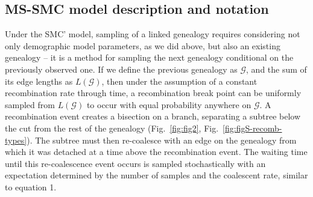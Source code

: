 \documentclass[11pt]{article}
\begin{document}

\subsection{MS-SMC model description and notation}

Under the SMC' model, sampling of a linked genealogy requires considering not only 
demographic model parameters, 
as we did above, but also an existing genealogy -- it is a method 
for sampling the next genealogy conditional on the previously observed one. 
If we define the previous genealogy as $\mathcal{G}$, and the sum of its edge lengths 
as $L(\mathcal{G})$, then under the assumption of a constant recombination rate through time,
a recombination break point can be uniformly sampled from $L(\mathcal{G})$ to occur with 
equal probability anywhere on $\mathcal{G}$. 
A recombination event creates a bisection on a branch, separating a subtree 
below the cut from the rest of the genealogy 
(Fig.~\ref{fig:fig2}, Fig.~\ref{fig:figS-recomb-types}).
The subtree must then re-coalesce 
with an edge on the genealogy from which it was detached at a time
above the recombination event.
The waiting time until 
this re-coalescence event occurs is sampled stochastically with an expectation 
determined by the number of samples and the coalescent rate, 
similar to equation 1.
\end{document}
